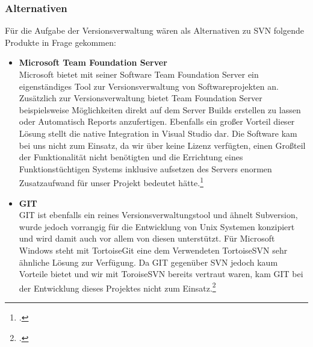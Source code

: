 \subsubsection{Alternativen}
Für die Aufgabe der Versionsverwaltung wären als Alternativen zu SVN folgende Produkte in Frage gekommen:
\begin{itemize}
\item \textbf{Microsoft Team Foundation Server}\\
Microsoft bietet mit seiner Software Team Foundation Server ein eigenständiges Tool zur Versionsverwaltung von Softwareprojekten an. 
Zusätzlich zur Versionsverwaltung bietet Team Foundation Server beispielsweise  Möglichkeiten direkt auf dem Server Builds erstellen zu lassen oder Automatisch Reports anzufertigen. Ebenfalls ein großer Vorteil dieser Lösung stellt die native Integration in Visual Studio dar. Die Software kam bei uns nicht zum Einsatz, da wir über keine Lizenz verfügten, einen Großteil der Funktionalität nicht benötigten und die Errichtung eines Funktionstüchtigen Systems inklusive aufsetzen des Servers enormen Zusatzaufwand für unser Projekt bedeutet hätte.\footcite[vgl.][]{tfs}
\item \textbf{GIT}\\
GIT ist ebenfalls ein reines Versionsverwaltungstool und ähnelt Subversion, wurde jedoch vorrangig für die Entwicklung von Unix Systemen konzipiert und wird damit auch vor allem von diesen unterstützt. 
Für Microsoft Windows steht mit TortoiseGit eine dem Verwendeten TortoiseSVN sehr ähnliche Lösung zur Verfügung. Da GIT gegenüber SVN jedoch kaum Vorteile bietet und wir mit ToroiseSVN bereits vertraut waren, kam GIT bei der Entwicklung dieses Projektes nicht zum Einsatz.\footcite[vgl.][]{git}
\end{itemize}